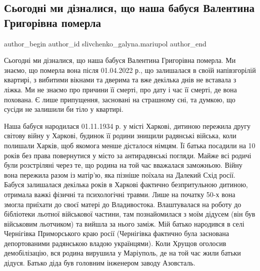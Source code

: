  
 
 
 
 

\subsection{Сьогодні ми дізналися, що наша бабуся Валентина Григорівна померла}
\label{sec:21_04_2022.fb.slivchenko_galyna.mariupol.1.babusja_valentyna_grigorivna}

\ifcmt
 author_begin
   author_id slivchenko_galyna.mariupol
 author_end
\fi

Сьогодні ми дізналися, що наша бабуся Валентина Григорівна померла. Ми знаємо,
що померла вона після 01.04.2022 р., що залишалася в своїй напівзгорілій
квартирі, з вибитими вікнами та дверима та вже декілька днів не вставала з
ліжка. Ми не знаємо про причини її смерті, про дату і час її смерті, де вона
похована. Є лише припущення, засновані на страшному сні, та думкою, що сусіди
не залишили би тіло у квартирі. 


Наша бабуся народилася 01.11.1934 р. у місті Харкові, дитиною пережила другу
світову війну у Харкові, будинок її родини знищили радянські війська, коли
полишали Харків, щоб якомога менше дісталося німцям. Її батька посадили на 10
років без права повернутися у місто за антирадянські погляди. Майже всі родичі
були розстріляні через те, що родина на той час вважалася заможньою. Війну вона
пережила разом із матір'ю, яка пізніше поїхала на Далекий Схід росії. Бабуся
залишалася декілька років в Харкові фактично безпритульною дитиною, отримала
важкі фізичні та психологічні травми. Лише на початку 50-х вона змогла приїхати
до своєї матері до Владивостока. Влаштувалася на роботу до бібліотеки льотної
військової частини, там познайомилася з моїм дідусем (він був військовим
льотчиком) та вийшла за нього заміж. Мій батько народився в селі Чернігівка
Приморського краю росії (Чернігівка фактично була заснована депортованими
радянською владою українцями). Коли Хрущов оголосив демобілізацію, вся родина
вирушила у Маріуполь, де на той час жили батьки дідуся. Батько діда був
головним інженером заводу Азовсталь. 

